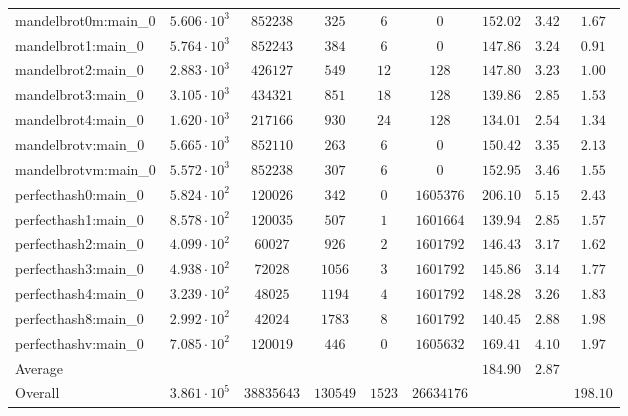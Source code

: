\begin{tabular}{|l|c|c|c|c|c|c|c|c|}
mandelbrot0m:main\_0           & $ 5.606 \cdot 10^{3} $ & $ 852238   $ & $ 325    $ & $ 6    $ & $ 0        $ & $ 152.02      $ & $ 3.42    $ & $ 1.67    $ \\
mandelbrot1:main\_0            & $ 5.764 \cdot 10^{3} $ & $ 852243   $ & $ 384    $ & $ 6    $ & $ 0        $ & $ 147.86      $ & $ 3.24    $ & $ 0.91    $ \\
mandelbrot2:main\_0            & $ 2.883 \cdot 10^{3} $ & $ 426127   $ & $ 549    $ & $ 12   $ & $ 128      $ & $ 147.80      $ & $ 3.23    $ & $ 1.00    $ \\
mandelbrot3:main\_0            & $ 3.105 \cdot 10^{3} $ & $ 434321   $ & $ 851    $ & $ 18   $ & $ 128      $ & $ 139.86      $ & $ 2.85    $ & $ 1.53    $ \\
mandelbrot4:main\_0            & $ 1.620 \cdot 10^{3} $ & $ 217166   $ & $ 930    $ & $ 24   $ & $ 128      $ & $ 134.01      $ & $ 2.54    $ & $ 1.34    $ \\
mandelbrotv:main\_0            & $ 5.665 \cdot 10^{3} $ & $ 852110   $ & $ 263    $ & $ 6    $ & $ 0        $ & $ 150.42      $ & $ 3.35    $ & $ 2.13    $ \\
mandelbrotvm:main\_0           & $ 5.572 \cdot 10^{3} $ & $ 852238   $ & $ 307    $ & $ 6    $ & $ 0        $ & $ 152.95      $ & $ 3.46    $ & $ 1.55    $ \\
perfecthash0:main\_0           & $ 5.824 \cdot 10^{2} $ & $ 120026   $ & $ 342    $ & $ 0    $ & $ 1605376  $ & $ 206.10      $ & $ 5.15    $ & $ 2.43    $ \\
perfecthash1:main\_0           & $ 8.578 \cdot 10^{2} $ & $ 120035   $ & $ 507    $ & $ 1    $ & $ 1601664  $ & $ 139.94      $ & $ 2.85    $ & $ 1.57    $ \\
perfecthash2:main\_0           & $ 4.099 \cdot 10^{2} $ & $ 60027    $ & $ 926    $ & $ 2    $ & $ 1601792  $ & $ 146.43      $ & $ 3.17    $ & $ 1.62    $ \\
perfecthash3:main\_0           & $ 4.938 \cdot 10^{2} $ & $ 72028    $ & $ 1056   $ & $ 3    $ & $ 1601792  $ & $ 145.86      $ & $ 3.14    $ & $ 1.77    $ \\
perfecthash4:main\_0           & $ 3.239 \cdot 10^{2} $ & $ 48025    $ & $ 1194   $ & $ 4    $ & $ 1601792  $ & $ 148.28      $ & $ 3.26    $ & $ 1.83    $ \\
perfecthash8:main\_0           & $ 2.992 \cdot 10^{2} $ & $ 42024    $ & $ 1783   $ & $ 8    $ & $ 1601792  $ & $ 140.45      $ & $ 2.88    $ & $ 1.98    $ \\
perfecthashv:main\_0           & $ 7.085 \cdot 10^{2} $ & $ 120019   $ & $ 446    $ & $ 0    $ & $ 1605632  $ & $ 169.41      $ & $ 4.10    $ & $ 1.97    $ \\
\hline
Average                        & $                    $ & $          $ & $        $ & $      $ & $          $ & $ 184.90      $ & $ 2.87    $ & $         $ \\
\hline
Overall                        & $ 3.861 \cdot 10^{5} $ & $ 38835643 $ & $ 130549 $ & $ 1523 $ & $ 26634176 $ & $             $ & $         $ & $ 198.10  $ \\
\hline
\end{tabular}

